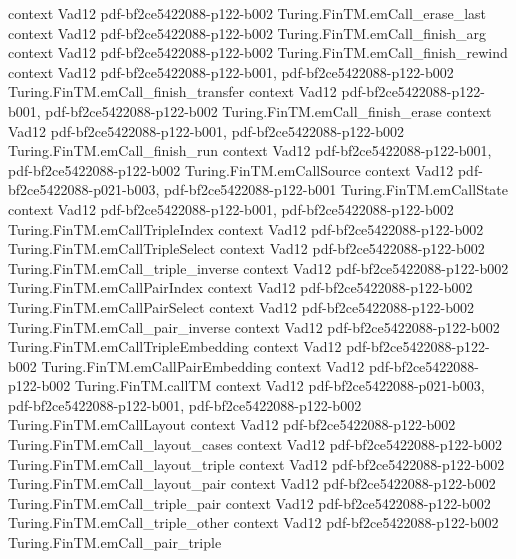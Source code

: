 \begin{theorem}
  {context}
  {Vad12}
  {pdf-bf2ce5422088-p122-b002}
\proofstep
  {Turing.FinTM.emCall_erase_last}
  {context}
  {Vad12}
  {pdf-bf2ce5422088-p122-b002}
\proofstep
  {Turing.FinTM.emCall_finish_arg}
  {context}
  {Vad12}
  {pdf-bf2ce5422088-p122-b002}
\proofstep
  {Turing.FinTM.emCall_finish_rewind}
  {context}
  {Vad12}
  {pdf-bf2ce5422088-p122-b001,
    pdf-bf2ce5422088-p122-b002}
\proofstep
  {Turing.FinTM.emCall_finish_transfer}
  {context}
  {Vad12}
  {pdf-bf2ce5422088-p122-b001,
    pdf-bf2ce5422088-p122-b002}
\proofstep
  {Turing.FinTM.emCall_finish_erase}
  {context}
  {Vad12}
  {pdf-bf2ce5422088-p122-b001,
    pdf-bf2ce5422088-p122-b002}
\proofstep
  {Turing.FinTM.emCall_finish_run}
  {context}
  {Vad12}
  {pdf-bf2ce5422088-p122-b001,
    pdf-bf2ce5422088-p122-b002}
\proofstep
  {Turing.FinTM.emCallSource}
  {context}
  {Vad12}
  {pdf-bf2ce5422088-p021-b003,
    pdf-bf2ce5422088-p122-b001}
\proofstep
  {Turing.FinTM.emCallState}
  {context}
  {Vad12}
  {pdf-bf2ce5422088-p122-b001,
    pdf-bf2ce5422088-p122-b002}
\proofstep
  {Turing.FinTM.emCallTripleIndex}
  {context}
  {Vad12}
  {pdf-bf2ce5422088-p122-b002}
\proofstep
  {Turing.FinTM.emCallTripleSelect}
  {context}
  {Vad12}
  {pdf-bf2ce5422088-p122-b002}
\proofstep
  {Turing.FinTM.emCall_triple_inverse}
  {context}
  {Vad12}
  {pdf-bf2ce5422088-p122-b002}
\proofstep
  {Turing.FinTM.emCallPairIndex}
  {context}
  {Vad12}
  {pdf-bf2ce5422088-p122-b002}
\proofstep
  {Turing.FinTM.emCallPairSelect}
  {context}
  {Vad12}
  {pdf-bf2ce5422088-p122-b002}
\proofstep
  {Turing.FinTM.emCall_pair_inverse}
  {context}
  {Vad12}
  {pdf-bf2ce5422088-p122-b002}
\proofstep
  {Turing.FinTM.emCallTripleEmbedding}
  {context}
  {Vad12}
  {pdf-bf2ce5422088-p122-b002}
\proofstep
  {Turing.FinTM.emCallPairEmbedding}
  {context}
  {Vad12}
  {pdf-bf2ce5422088-p122-b002}
\proofstep
  {Turing.FinTM.callTM}
  {context}
  {Vad12}
  {pdf-bf2ce5422088-p021-b003,
    pdf-bf2ce5422088-p122-b001,
    pdf-bf2ce5422088-p122-b002}
\proofstep
  {Turing.FinTM.emCallLayout}
  {context}
  {Vad12}
  {pdf-bf2ce5422088-p122-b002}
\proofstep
  {Turing.FinTM.emCall_layout_cases}
  {context}
  {Vad12}
  {pdf-bf2ce5422088-p122-b002}
\proofstep
  {Turing.FinTM.emCall_layout_triple}
  {context}
  {Vad12}
  {pdf-bf2ce5422088-p122-b002}
\proofstep
  {Turing.FinTM.emCall_layout_pair}
  {context}
  {Vad12}
  {pdf-bf2ce5422088-p122-b002}
\proofstep
  {Turing.FinTM.emCall_triple_pair}
  {context}
  {Vad12}
  {pdf-bf2ce5422088-p122-b002}
\proofstep
  {Turing.FinTM.emCall_triple_other}
  {context}
  {Vad12}
  {pdf-bf2ce5422088-p122-b002}
\proofstep
  {Turing.FinTM.emCall_pair_triple}

\end{theorem}

